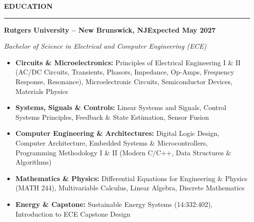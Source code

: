 \documentclass[10pt]{article}
\newcommand{\Section}[1]{%
  \vspace{4.5pt}%
  \textbf{\MakeUppercase{#1}}\par\vspace{-3.5pt}%
  \rule{\linewidth}{0.55pt}\par\vspace{2.5pt}%
}
\newcommand{\Company}[2]{\noindent\textbf{#1}\hfill\textbf{#2}\par}
\newcommand{\RoleDates}[2]{\noindent\textit{#1}\hfill\textit{#2}\par}
\begin{document}
\Section{Education}
\Company{Rutgers University -- New Brunswick, NJ}{Expected May 2027}
\RoleDates{Bachelor of Science in Electrical and Computer Engineering (ECE)}{}
\vspace{1.5pt}
\begin{itemize}[leftmargin=0.15in, label={}, itemsep=1.0pt, topsep=1.0pt]
  \item \textbf{Circuits \& Microelectronics:} Principles of Electrical Engineering I \& II (AC/DC Circuits, Transients, Phasors, Impedance, Op-Amps, Frequency Response, Resonance), Microelectronic Circuits, Semiconductor Devices, Materials Physics
  \item \textbf{Systems, Signals \& Controls:} Linear Systems and Signals, Control Systems Principles, Feedback \& State Estimation, Sensor Fusion
  \item \textbf{Computer Engineering \& Architectures:} Digital Logic Design, Computer Architecture, Embedded Systems \& Microcontrollers, Programming Methodology I \& II (Modern C/C++, Data Structures \& Algorithms)
  \item \textbf{Mathematics \& Physics:} Differential Equations for Engineering \& Physics (MATH 244), Multivariable Calculus, Linear Algebra, Discrete Mathematics
  \item \textbf{Energy \& Capstone:} Sustainable Energy Systems (14:332:402), Introduction to ECE Capstone Design
\end{itemize}
\end{document}
